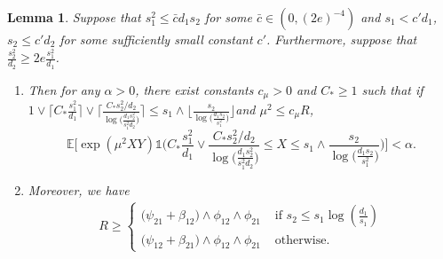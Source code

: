 \documentclass{article}
\newcommand{\EE}{\mathbb{E}}
\newcommand{\one}{\mathds{1}}
\newcommand{\Ct}{C_{*}}
\newtheorem{lemma}{Lemma}
\theoremstyle{remark}
\begin{document}
\begin{lemma}\label{lem_simplify_s2d2big_truncchi2}
Suppose that $s_1^2 \leq \bar{c}d_1s_2$ for some $\bar{c} \in (0, (2e)^{-4})$ and $s_1 < c' d_1$, $s_2 \leq c' d_2$ for some sufficiently small constant $c'$. 
    Furthermore, suppose that $\frac{s^2_2}{d_2} \geq 2e\frac{s_1^2}{d_1}$. 
    \begin{enumerate}
        \item Then for any $\alpha > 0$, there exist constants $c_\mu > 0$ and $C_* \geq 1$ such that if $1 \vee \big\lceil \Ct \frac{s_1^2}{d_1}\big\rceil \vee \Big\lceil \frac{\Ct s_2^2/d_2}{\log\big(\frac{d_1s_2^2}{s_1^2d_2}\big)}\Big\rceil \leq s_1\wedge\big\lfloor\frac{s_2}{\log\big(\frac{d_1s_2}{s_1^2}\big)}\big\rfloor$and $\mu^2 \leq c_\mu R$, 
    \[\EE\Big[\exp(\mu^2XY)\one\Big( \Ct \frac{s_1^2}{d_1} \vee \frac{\Ct s_2^2/d_2}{\log\big(\frac{d_1s_2^2}{s_1^2d_2}\big)} \leq X \leq s_1\wedge\frac{s_2}{\log\big(\frac{d_1s_2}{s_1^2}\big)}\Big)\Big] < \alpha.\]
    \item Moreover, we have
    \begin{align*}
        R \geq \begin{cases}
            \big(\psi_{21} + \beta_{12}\big)\land \phi_{12} \land \phi_{21} & \text{ if } s_2 \leq s_1 \log\left(\frac{d_1}{s_1}\right)\\
            \big(\psi_{12} + \beta_{21}\big)\land \phi_{12} \land \phi_{21} & \text{ otherwise. } 
        \end{cases}
    \end{align*}
    \end{enumerate}
\end{lemma}
\end{document}
